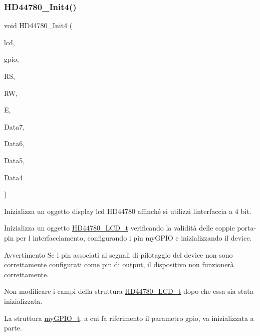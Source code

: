 \subsubsection{\texorpdfstring{H\+D44780\+\_\+\+Init4()}{HD44780\_Init4()}}
{\footnotesize\ttfamily void H\+D44780\+\_\+\+Init4 (\begin{DoxyParamCaption}\item[{\hyperlink{struct_h_d44780___l_c_d__t}{H\+D44780\+\_\+\+L\+C\+D\+\_\+t} $\ast$}]{lcd,  }\item[{\hyperlink{structmy_g_p_i_o__t}{my\+G\+P\+I\+O\+\_\+t} $\ast$}]{gpio,  }\item[{\hyperlink{group__bare-metal_ga402a0d20afc0cb7c25554b8b023f4253}{my\+G\+P\+I\+O\+\_\+mask}}]{RS,  }\item[{\hyperlink{group__bare-metal_ga402a0d20afc0cb7c25554b8b023f4253}{my\+G\+P\+I\+O\+\_\+mask}}]{RW,  }\item[{\hyperlink{group__bare-metal_ga402a0d20afc0cb7c25554b8b023f4253}{my\+G\+P\+I\+O\+\_\+mask}}]{E,  }\item[{\hyperlink{group__bare-metal_ga402a0d20afc0cb7c25554b8b023f4253}{my\+G\+P\+I\+O\+\_\+mask}}]{Data7,  }\item[{\hyperlink{group__bare-metal_ga402a0d20afc0cb7c25554b8b023f4253}{my\+G\+P\+I\+O\+\_\+mask}}]{Data6,  }\item[{\hyperlink{group__bare-metal_ga402a0d20afc0cb7c25554b8b023f4253}{my\+G\+P\+I\+O\+\_\+mask}}]{Data5,  }\item[{\hyperlink{group__bare-metal_ga402a0d20afc0cb7c25554b8b023f4253}{my\+G\+P\+I\+O\+\_\+mask}}]{Data4 }\end{DoxyParamCaption})}



Inizializza un oggetto display lcd H\+D44780 affinché si utilizzi l\textquotesingle{}interfaccia a 4 bit. 

Inizializza un oggetto \hyperlink{struct_h_d44780___l_c_d__t}{H\+D44780\+\_\+\+L\+C\+D\+\_\+t} verificando la validità delle coppie porta-\/pin per l\textquotesingle{} interfacciamento, configurando i pin my\+G\+P\+IO e inizializzando il device.

\begin{DoxyWarning}{Avvertimento}
Se i pin associati ai segnali di pilotaggio del device non sono correttamente configurati come pin di output, il dispositivo non funzionerà correttamente.

Non modificare i campi della struttura \hyperlink{struct_h_d44780___l_c_d__t}{H\+D44780\+\_\+\+L\+C\+D\+\_\+t} dopo che essa sia stata inizializzata.

La struttura \hyperlink{structmy_g_p_i_o__t}{my\+G\+P\+I\+O\+\_\+t}, a cui fa riferimento il parametro gpio, va inizializzata a parte.
\end{DoxyWarning}

